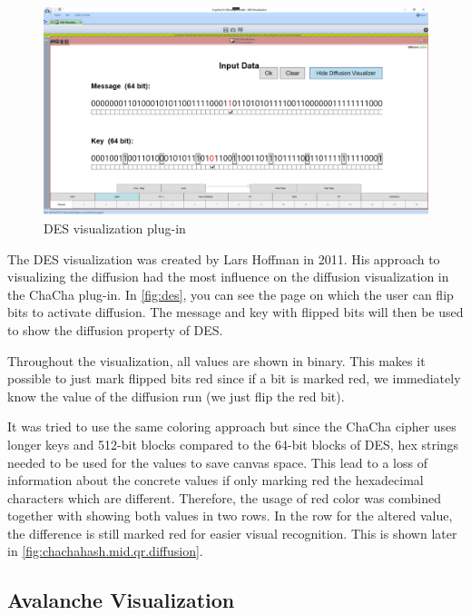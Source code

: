 \begin{figure}
\centering
\includegraphics[width=\textwidth]{figures/ct2/des.png}
\caption{DES visualization plug-in}
\label{fig:des}
\end{figure}

The DES visualization was created by Lars Hoffman in 2011. His approach to visualizing the diffusion had the most influence on the diffusion visualization in the ChaCha plug-in. In \autoref{fig:des}, you can see the page on which the user can flip bits to activate diffusion. The message and key with flipped bits will then be used to show the diffusion property of DES. 

Throughout the visualization, all values are shown in binary. This makes it possible to just mark flipped bits red since if a bit is marked red, we immediately know the value of the diffusion run (we just flip the red bit). 

It was  tried to use the same coloring approach but since the ChaCha cipher uses longer keys and 512-bit blocks compared to the 64-bit blocks of DES, hex strings needed to be used for the values to save canvas space. This lead to a loss of information about the concrete values if only marking red the hexadecimal characters which are different. Therefore, the usage of red color was combined together with showing both values in two rows. In the row for the altered value, the difference is still marked red for easier visual recognition. This is shown later in \autoref{fig:chachahash.mid.qr.diffusion}.

\vfill

\pagebreak

\subsection{Avalanche Visualization}
\label{sec:avalancheVisualization}

